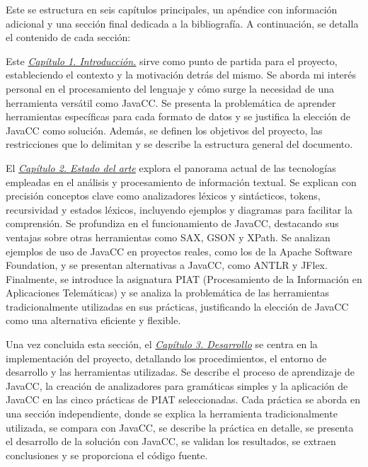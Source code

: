 



\noindent Este \pfg se estructura en seis capítulos principales, un apéndice con información adicional y una sección final dedicada a la bibliografía. A continuación, se detalla el contenido de cada sección:

Este \hyperref[sec:cap1]{\textit{Capítulo 1. Introducción.}} sirve como punto de partida para el proyecto, estableciendo el contexto y la motivación detrás del mismo. Se aborda mi interés personal en el procesamiento del lenguaje y cómo surge la necesidad de una herramienta versátil como JavaCC. Se presenta la problemática de aprender herramientas específicas para cada formato de datos y se justifica la elección de JavaCC como solución. Además, se definen los objetivos del proyecto, las restricciones que lo delimitan y se describe la estructura general del documento.

El \hyperref[sec:cap2]{\textit{Capítulo 2. Estado del arte}} explora el panorama actual de las tecnologías empleadas en el análisis y procesamiento de información textual. Se explican con precisión conceptos clave como analizadores léxicos y sintácticos, tokens, recursividad y estados léxicos, incluyendo ejemplos y diagramas para facilitar la comprensión. Se profundiza en el funcionamiento de JavaCC, destacando sus ventajas sobre otras herramientas como SAX, GSON y XPath. Se analizan ejemplos de uso de JavaCC en proyectos reales, como los de la Apache Software Foundation, y se presentan alternativas a JavaCC, como ANTLR y JFlex. Finalmente, se introduce la asignatura PIAT (Procesamiento de la Información en Aplicaciones Telemáticas) y se analiza la problemática de las herramientas tradicionalmente utilizadas en sus prácticas, justificando la elección de JavaCC como una alternativa eficiente y flexible.

Una vez concluida esta sección, el \hyperref[sec:cap3]{\textit{Capítulo 3. Desarrollo}} se centra en la implementación del proyecto, detallando los procedimientos, el entorno de desarrollo y las herramientas utilizadas. Se describe el proceso de aprendizaje de JavaCC, la creación de analizadores para gramáticas simples y la aplicación de JavaCC en las cinco prácticas de PIAT seleccionadas. Cada práctica se aborda en una sección independiente, donde se explica la herramienta tradicionalmente utilizada, se compara con JavaCC, se describe la práctica en detalle, se presenta el desarrollo de la solución con JavaCC, se validan los resultados, se extraen conclusiones y se proporciona el código fuente.


